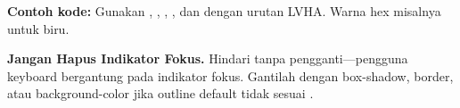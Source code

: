 \noindent\textbf{Contoh kode:} Gunakan , , , , dan  dengan urutan LVHA. Warna hex misalnya  untuk biru.

\begin{konsep}
\textbf{Jangan Hapus Indikator Fokus.} Hindari  tanpa pengganti---pengguna keyboard bergantung pada indikator fokus. Gantilah dengan box-shadow, border, atau background-color jika outline default tidak sesuai \cite{webdevCss}.
\end{konsep}

